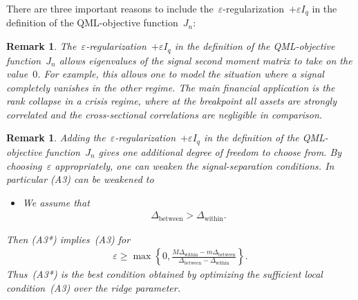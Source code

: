 \documentclass[10pt, letterpaper]{amsart}
\newtheorem{remark}[theorem]{Remark}
\begin{document}
There are three important reasons to include the~$\varepsilon$-regularization~$+ \varepsilon I_q$ in the definition of the QML-objective function~$J_{n}$:
\begin{remark}\label{rem:epsilon_regularization}
    The~$\varepsilon$-regularization~$+ \varepsilon I_q$ in the definition of the QML-objective function~$J_{n}$ allows eigenvalues of the signal second moment matrix to take on the value~$0$. For example, this allows one to model the situation where a signal completely vanishes in the other regime. The main financial application is the rank collapse in a crisis regime, where at the breakpoint all assets are strongly correlated and the cross-sectional correlations are negligible in comparison.
\end{remark}
\begin{remark}\label{rem:ridge_regularization_and_SNR}
 Adding the~$\varepsilon$-regularization~$+ \varepsilon I_q$ in the definition of the QML-objective function~$J_{n}$ gives one additional degree of freedom to choose from. By choosing~$\varepsilon$ appropriately, one can weaken the signal-separation conditions. In particular (A3) can be weakened to
 \begin{itemize}
     \item[(A3*)] We assume that
     \begin{align}
         \Delta_{\text{between}}  > \Delta_{\text{within}} .
     \end{align}
 \end{itemize}
Then (A3*) implies~(A3) for
\begin{align}
    \varepsilon\geq \max \left\{0, \frac{ M \Delta_{\text{within}}- m\Delta_{\text{between}}}{\Delta_{\text{between}}-\Delta_{\text{within}}} \right\}.
\end{align}
Thus~\textup{(A3*)} is the best condition obtained by
optimizing the sufficient local condition~\textup{(A3)} over the ridge
parameter.
 

\end{remark}
\end{document}
